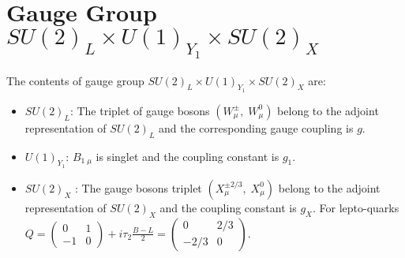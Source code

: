 \documentclass{ws-ijmpa}
\begin{document}
\section{Gauge Group $SU(2)_L\times U(1)_{Y_1}\times SU(2)_X$ }
The contents of gauge group $SU(2)_L\times U(1)_{Y_1}\times SU(2)_X$ are:
\begin{itemize}
\item $SU(2)_L$: The triplet of gauge bosons $(W^{\pm}_{\mu},\; W^{0}_{\mu})$ belong to the adjoint representation of $SU(2)_L$ and the corresponding gauge coupling is $g$.
\item $U(1)_{Y_1}$: $B_{1\;\mu}$ is singlet and the coupling constant is $g_{1}$.
\item $SU(2)_X$ : The gauge bosons triplet $(X_{\mu}^{\pm 2/3},\;X_{\mu}^{0})$ belong to the adjoint representation of $SU(2)_X$ and the coupling constant is  $g_X$. For lepto-quarks $Q = \left(\begin{array}{cc} 0 & 1 \\ -1 & 0 \end{array}\right) + i\tau_{2}\frac{B-L}{2} = \left(\begin{array}{cc} 0 & 2/3 \\
-2/3 & 0 
\end{array}\right)$.
\end{itemize}
\end{document}
